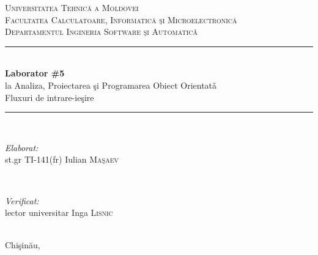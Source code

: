 \documentclass[12pt]{article}
\begin{document}
\begin{titlepage}

\newcommand{\HRule}{\rule{\linewidth}{0.5mm}} 

\center 
 

\textsc{\LARGE Universitatea Tehnic\u{a} a Moldovei}\\[0.8cm] 
\textsc{\Large Facultatea Calculatoare, Informatic\u{a} \c{s}i Microelectronic\u{a}}\\[0.5cm] 
\textsc{\large Departamentul Ingineria Software \c{s}i Automatic\v{a}}\\[5.2cm] 

\HRule \\[0.4cm]
{ \huge \bfseries Laborator \#5}\\[0.3cm]
{\large la Analiza, Proiectarea \c{s}i Programarea Obiect Orientat\v{a}}\\
{\large Fluxuri de intrare-ie\c{s}ire}\\[0.4cm] 
\HRule \\[5.5cm]
 

\begin{minipage}{0.4\textwidth}
\begin{flushleft} \large
\emph{Elaborat:}\\
st.gr TI-141(fr) Iulian \textsc{Ma\c{s}aev} 
\end{flushleft}
\end{minipage}
~
\begin{minipage}{0.4\textwidth}
\begin{flushright} \large
\emph{Verificat:} \\
lector universitar Inga \textsc{Lisnic} 
\end{flushright}
\end{minipage}\\[4cm]


\vfill 
{\large Chi\c{s}in\u{a}u, \the\year}\\[3cm] 



\end{titlepage}

%


%
%

\end{document}
